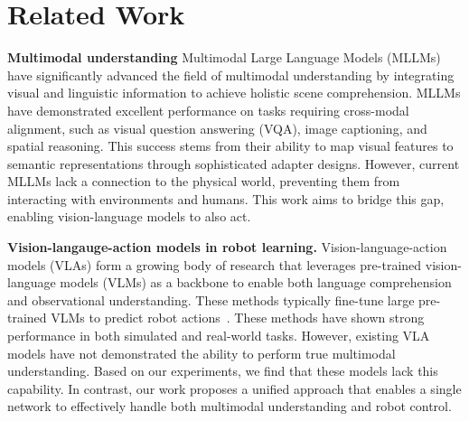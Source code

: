 \section{Related Work}
\textbf{Multimodal understanding}
Multimodal Large Language Models (MLLMs)~\cite{lu2024deepseek-vl, openflamingo, idefics, llava, llava1.5, wang2024qwen2, chen2024internvl, zhu2024comprehensive, ma2024janusflow, zhou2024transfusion, minigpt4, luo2024mono, chen2024internvl, blip-2, instructblip, chen2024expanding,karamcheti2024prismatic} have significantly advanced the field of multimodal understanding by integrating visual and linguistic information to achieve holistic scene comprehension. MLLMs have demonstrated excellent performance on tasks requiring cross-modal alignment, such as visual question answering (VQA), image captioning, and spatial reasoning. This success stems from their ability to map visual features to semantic representations through sophisticated adapter designs. However, current MLLMs lack a connection to the physical world, preventing them from interacting with environments and humans. This work aims to bridge this gap, enabling vision-language models to also act.

\textbf{Vision-langauge-action models in robot learning.} Vision-language-action models (VLAs) form a growing body of research that leverages pre-trained vision-language models (VLMs) as a backbone to enable both language comprehension and observational understanding. These methods typically fine-tune large pre-trained VLMs to predict robot actions~\cite{brohan2023rt-2, roboflamingo, leo3d, wen2024tinyvla, pertsch2025fast, [pi0, kim24openvla, diffusion-policy, zhu2024scalingdp, wang2024sparse-dp, prasad2024consistencypolicy, black2023training, black2023zero, dasari2024ingredients, lin2024datascalinglawsimitation, multimodal_diffusion_transformer, aloha_unleashed, uehara2024fine, uehara2024feedback,ding2024quar}. These methods have shown strong performance in both simulated and real-world tasks. However, existing VLA models have not demonstrated the ability to perform true multimodal understanding. Based on our experiments, we find that these models lack this capability. In contrast, our work proposes a unified approach that enables a single network to effectively handle both multimodal understanding and robot control.